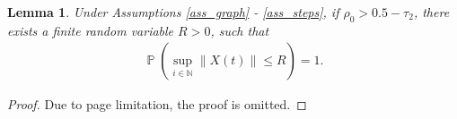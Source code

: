 \documentclass[10pt,journal,final]{IEEEtran}
\DeclareMathOperator{\Expect}{\mathbb{E}}
\DeclareMathOperator{\Pro}{\mathbb{P}}
\newcommand{\norm}[1]{\left\lVert#1\right\rVert}
\theoremstyle{plain}
\newtheorem{lemma}{\textbf{Lemma}}[section]
\theoremstyle{definition}
\theoremstyle{remark}
\begin{document}
\begin{lemma}\label{lem_bound}
Under Assumptions \ref{ass_graph} - \ref{ass_steps}, if $\rho_0>0.5-\tau_2$,  there exists a finite random variable $R>0$, such that
\begin{align*}
\Pro\left(\sup_{i\in\mathbb{N}}\norm{X(t)}\leq R\right)=1.
\end{align*}
\end{lemma}
\begin{proof}
	Due to page limitation, the proof is omitted.

\end{proof}
\end{document}

